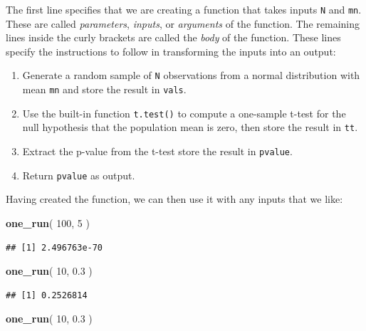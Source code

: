 \documentclass[
]{book}
\newenvironment{Shaded}{\begin{snugshade}}{\end{snugshade}}
\newcommand{\DecValTok}[1]{\textcolor[rgb]{0.00,0.00,0.81}{#1}}
\newcommand{\FloatTok}[1]{\textcolor[rgb]{0.00,0.00,0.81}{#1}}
\newcommand{\FunctionTok}[1]{\textcolor[rgb]{0.13,0.29,0.53}{\textbf{#1}}}
\newcommand{\NormalTok}[1]{#1}
\providecommand{\tightlist}{%
  \setlength{\itemsep}{0pt}\setlength{\parskip}{0pt}}
\begin{document}
The first line specifies that we are creating a function that takes inputs \texttt{N} and \texttt{mn}. These are called \emph{parameters}, \emph{inputs}, or \emph{arguments} of the function. The remaining lines inside the curly brackets are called the \emph{body} of the function. These lines specify the instructions to follow in transforming the inputs into an output:

\begin{enumerate}
\def\labelenumi{\arabic{enumi}.}
\tightlist
\item
  Generate a random sample of \texttt{N} observations from a normal distribution with mean \texttt{mn} and store the result in \texttt{vals}.
\item
  Use the built-in function \texttt{t.test()} to compute a one-sample t-test for the null hypothesis that the population mean is zero, then store the result in \texttt{tt}.
\item
  Extract the p-value from the t-test store the result in \texttt{pvalue}.
\item
  Return \texttt{pvalue} as output.
\end{enumerate}

Having created the function, we can then use it with any inputs that we like:

\begin{Shaded}
\begin{Highlighting}[]
\FunctionTok{one\_run}\NormalTok{( }\DecValTok{100}\NormalTok{, }\DecValTok{5}\NormalTok{ )}
\end{Highlighting}
\end{Shaded}

\begin{verbatim}
## [1] 2.496763e-70
\end{verbatim}

\begin{Shaded}
\begin{Highlighting}[]
\FunctionTok{one\_run}\NormalTok{( }\DecValTok{10}\NormalTok{, }\FloatTok{0.3}\NormalTok{ )}
\end{Highlighting}
\end{Shaded}

\begin{verbatim}
## [1] 0.2526814
\end{verbatim}

\begin{Shaded}
\begin{Highlighting}[]
\FunctionTok{one\_run}\NormalTok{( }\DecValTok{10}\NormalTok{, }\FloatTok{0.3}\NormalTok{ )}
\end{Highlighting}
\end{Shaded}
\end{document}
